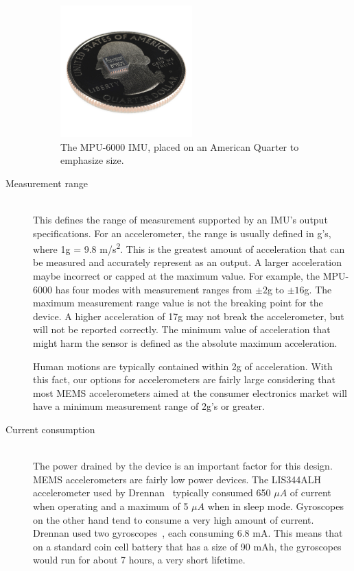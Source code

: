 \begin{description}
\begin{figure}
\begin{center}
\includegraphics[width=0.5\textwidth]{images/MPU6000Size.jpg}
\caption{The MPU-6000 IMU, placed on an American Quarter to emphasize size.}
\label{fig:MPU6000Size}
\end{center}
\end{figure}

\item[Measurement range] \hfill \\
This defines the range of measurement supported by an IMU's output specifications.
For an accelerometer, the range is usually defined in g's, where 1g = 9.8 m/s\textsuperscript{2}.
This is the greatest amount of acceleration that can be measured and accurately represent as an output.
A larger acceleration maybe incorrect or capped at the maximum value.
For example, the MPU-6000 has four modes with measurement ranges from $\pm{2}$g to $\pm{16}$g.
The maximum measurement range value is not the breaking point for the device.
A higher acceleration of 17g may not break the accelerometer, but will not be reported correctly.
The minimum value of acceleration that might harm the sensor is defined as the absolute maximum acceleration.
 
Human motions are typically contained within 2g of acceleration.
With this fact, our options for accelerometers are fairly large
considering that most MEMS accelerometers aimed at the consumer electronics market will have a minimum measurement range of 2g's or greater. 
\hfill 
\item[Current consumption] \hfill \\
The power drained by the device is an important factor for this design.
MEMS accelerometers are fairly low power devices.
The LIS344ALH accelerometer used by Drennan~\cite{drennan2010assessment} typically consumed 650 $\mu{A}$ of current when operating and a maximum of 5 $\mu{A}$ when in sleep mode.
Gyroscopes on the other hand tend to consume a very high amount of current.
Drennan used two gyroscopes~\cite{drennan2010assessment}, each consuming 6.8 mA.
This means that on a standard coin cell battery that has a size of 90 mAh,
the gyroscopes would run for about 7 hours, a very short lifetime.


\end{description}
